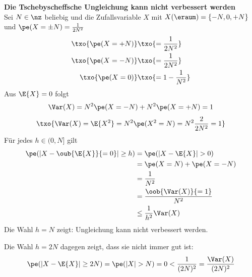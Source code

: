 \begin{bsp}
    \textbf{Die Tschebyscheffsche Ungleichung kann nicht verbessert werden}  \\
    Sei $N \in \nz$ beliebig und die Zufallsvariable $X$ mit $X(\eraum) = \{ -N, 0, +N\}$ und $\pe ( X = \pm N) = \frac{1}{2N^2}$
    \begin{align*}
        \txo{\pe( X= +N)} & \txo{= \frac{1}{2N^2}} \\
        \txo{\pe( X= -N)} & \txo{= \frac{1}{2N^2}} \\
        \txo{\pe( X= 0)} & \txo{= 1- \frac{1}{N^2}}
    \end{align*}
    Aus $\E{X} = 0$ folgt
    \[
        \Var(X) = N^2 \pe (X = -N) + N^2 \pe (X = +N) = 1
    \]
    \[
        \txo{
        \Var(X) = \E{X^2} = N^2 \pe(X^2 = N) = N^2 \frac{2}{2N^2} = 1
        }
    \]
    Für jedes $h \in (0,N]$ gilt
    \begin{align*}
        \pe(|X - \oub{\E{X}}{=0}|  \geq h ) & =  \pe(|X - \E{X} | > 0) \\
        & = \pe (X = N) + \pe (X = -N) \\
        & = \frac{1}{N^2} \\
        & = \frac{ \oob{\Var(X)}{=1} }{N^2} \\
        & \leq \frac{1}{h^2} \Var(X)
    \end{align*}
    Die Wahl $h = N$ zeigt: Ungleichung kann nicht verbessert werden.

    Die Wahl $h = 2N$ dagegen zeigt, dass sie nicht immer gut ist:
    \[
        \pe(|X - \E{X} | \geq 2N) = \pe(|X | > N) = 0 < \frac{1}{(2N)^2} = \frac{\Var(X)}{(2N)^2}
    \]
\end{bsp}

